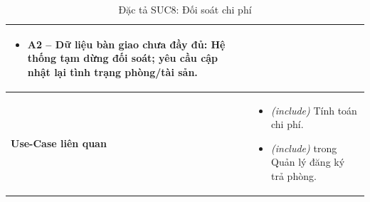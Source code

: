 \begin{table}[H]
\begin{tabularx}{\textwidth}{|>{\centering\arraybackslash\bfseries}m{3.5cm}|X|}
\begin{itemize}[leftmargin=*, nosep, label=-]
        \item \textbf{A2 -- Dữ liệu bàn giao chưa đầy đủ:} Hệ thống tạm dừng đối soát; yêu cầu cập nhật lại tình trạng phòng/tài sản.
    \end{itemize} \\
    \hline
    Use-Case liên quan &
    \begin{itemize}[leftmargin=*, nosep, label=-]
        \vspace{0.1cm}
        \item \textit{(include)} Tính toán chi phí.
        \item \textit{(include)} trong Quản lý đăng ký trả phòng.
\end{itemize} \\
    \hline
\end{tabularx}
\caption{Đặc tả SUC8: Đối soát chi phí}
\end{table}

\vspace{1cm}

